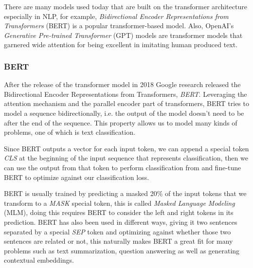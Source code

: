 \documentclass[12pt]{diazessay}
\newcounter{subsubsubsection}[subsubsection]
\begin{document}
        There are many models used today that are built on the transformer architecture especially in NLP, for example, \emph{Bidirectional Encoder Representations from Transformers} (BERT) is a popular transformer-based model. Also, OpenAI's \emph{Generative Pre-trained Transformer} (GPT) models are transformer models that garnered wide attention for being excellent in imitating human produced text.
        
        \subsubsection{BERT}
            
        After the release of the transformer model in 2018 Google research released the Bidirectional Encoder Representations from Transformers, \emph{BERT}. Leveraging the attention mechanism and the parallel encoder part of transformers, BERT tries to model a sequence bidirectionally, i.e. the output of the model doesn't need to be after the end of the sequence. This property allows us to model many kinds of problems, one of which is text classification.\cite{BERT}
            
            Since BERT outputs a vector for each input token, we can append a special token \emph{CLS} at the beginning of the input sequence that represents classification, then we can use the output from that token to perform classification from and fine-tune BERT to optimize against our classification loss. 
            
            BERT is usually trained by predicting a masked 20\% of the input tokens that we transform to a \emph{MASK} special token, this is called \emph{Masked Language Modeling} (MLM), doing this requires BERT to consider the left and right tokens in its prediction.
            BERT has also been used in different ways, giving it two sentences separated by a special \emph{SEP} token and optimizing against whether those two sentences are related or not, this naturally makes BERT a great fit for many problems such as text summarization, question answering as well as generating contextual embeddings.\cite{BERT}
            
            
\end{document}
